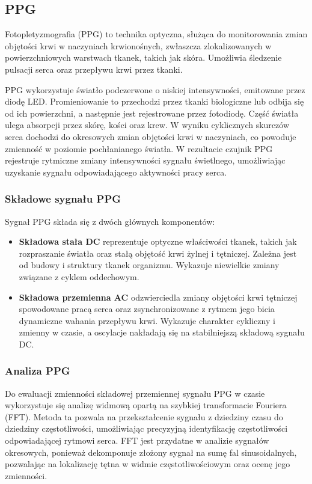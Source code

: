 \documentclass{article}
\begin{document}
\subsection{PPG}
Fotopletyzmografia (PPG) to technika optyczna, służąca do monitorowania zmian objętości krwi w naczyniach krwionośnych, zwłaszcza zlokalizowanych w powierzchniowych warstwach tkanek, takich jak skóra. Umożliwia śledzenie pulsacji serca oraz przepływu krwi przez tkanki.

PPG wykorzystuje światło podczerwone o niskiej intensywności, emitowane przez diodę LED. Promieniowanie to przechodzi przez tkanki biologiczne lub odbija się od ich powierzchni, a następnie jest rejestrowane przez fotodiodę. Część światła ulega absorpcji przez skórę, kości oraz krew. W wyniku cyklicznych skurczów serca dochodzi do okresowych zmian objętości krwi w naczyniach, co powoduje zmienność w poziomie pochłanianego światła. W rezultacie czujnik PPG rejestruje rytmiczne zmiany intensywności sygnału świetlnego, umożliwiając uzyskanie sygnału odpowiadającego aktywności pracy serca.

\subsubsection{Składowe sygnału PPG}
Sygnał PPG składa się z dwóch głównych komponentów:
\begin{itemize}
\item \textbf{Składowa stała DC} reprezentuje optyczne właściwości tkanek, takich jak rozpraszanie światła oraz stałą objętość krwi żylnej i tętniczej. Zależna jest od budowy i struktury tkanek organizmu. Wykazuje niewielkie zmiany związane z cyklem oddechowym.
\item \textbf{Składowa przemienna AC} odzwierciedla zmiany objętości krwi tętniczej spowodowane pracą serca oraz zsynchronizowane z rytmem jego bicia dynamiczne wahania przepływu krwi. Wykazuje charakter cykliczny i zmienny w czasie, a oscylacje nakładają się na stabilniejszą składową sygnału DC.
\end{itemize}

\subsubsection{Analiza PPG}
Do ewaluacji zmienności składowej przemiennej sygnału PPG w czasie wykorzystuje się analizę widmową opartą na szybkiej transformacie Fouriera (FFT). Metoda ta pozwala na przekształcenie sygnału z dziedziny czasu do dziedziny częstotliwości, umożliwiając precyzyjną identyfikację częstotliwości odpowiadającej rytmowi serca. FFT jest przydatne w analizie sygnałów okresowych, ponieważ dekomponuje złożony sygnał na sumę fal sinusoidalnych, pozwalając na lokalizację tętna w widmie częstotliwościowym oraz ocenę jego zmienności.
\end{document}
